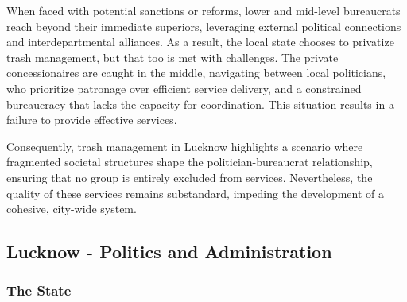 When faced with potential sanctions or reforms, lower and mid-level bureaucrats reach beyond their immediate superiors, leveraging external political connections and interdepartmental alliances. As a result, the local state chooses to privatize trash management, but that too is met with challenges. The private concessionaires are caught in the middle, navigating between local politicians, who prioritize patronage over efficient service delivery, and a constrained bureaucracy that lacks the capacity for coordination. This situation results in a failure to provide effective services.

Consequently, trash management in Lucknow highlights a scenario where fragmented societal structures shape the politician-bureaucrat relationship, ensuring that no group is entirely excluded from services. Nevertheless, the quality of these services remains substandard, impeding the development of a cohesive, city-wide system.

\subsection{Lucknow - Politics and Administration}

\subsubsection{The State}

